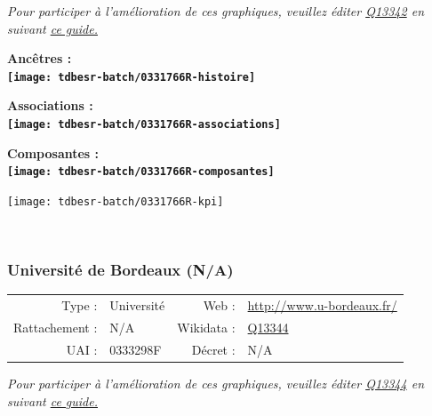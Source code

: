 \documentclass[12pt,french,]{article}
\begin{document}
\textit{\scriptsize Pour participer à l'amélioration de ces graphiques, veuillez éditer  \href{https://www.wikidata.org/entity/Q13342}{Q13342}  en suivant \href{https://github.com/cpesr/wikidataESR/blob/master/Rmd/wikidataESR.md}{ce guide.}}

\vspace{1cm}  
\begin{minipage}[b]{0.50\textwidth}\begin{center} \bf Ancêtres : \\  
\texttt{[image: tdbesr-batch/0331766R-histoire]} \end{center}\end{minipage}\begin{minipage}[b]{0.50\textwidth}\begin{center} \bf Associations : \\  
\texttt{[image: tdbesr-batch/0331766R-associations]} \end{center}\end{minipage}

\hrulefill

\begin{center} \bf Composantes : \\  
\texttt{[image: tdbesr-batch/0331766R-composantes]} \end{center}

\begin{center}\texttt{[image: tdbesr-batch/0331766R-kpi]} \end{center}\checkoddpage

\ifoddpage ~\newpage \fi   

\hypertarget{universituxe9-de-bordeaux-na}{%
\subsubsection{Université de Bordeaux
(N/A)}\label{universituxe9-de-bordeaux-na}}

\begin{tabular*}{\textwidth}{rp{5cm}rl}  
\hline  
Type : & Université & Web : &\href{http://www.u-bordeaux.fr/}{http://www.u-bordeaux.fr/} \\  
Rattachement : & N/A & Wikidata : & \href{https://www.wikidata.org/entity/Q13344}{Q13344} \\  
UAI : & 0333298F & Décret : & N/A \\  
\hline  
\end{tabular*}

\textit{\scriptsize Pour participer à l'amélioration de ces graphiques, veuillez éditer  \href{https://www.wikidata.org/entity/Q13344}{Q13344}  en suivant \href{https://github.com/cpesr/wikidataESR/blob/master/Rmd/wikidataESR.md}{ce guide.}}
\end{document}
